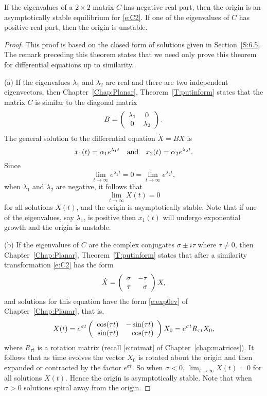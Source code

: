 \documentclass{ximera}
\begin{document}
\begin{theorem}  \label{C:asympstlin}
If the eigenvalues of a $2\times 2$ matrix $C$ has negative real part, then 
the origin is an asymptotically stable equilibrium for \eqref{e:C2}.
If one of the
eigenvalues of $C$ has positive real part, then the origin is unstable.
\end{theorem}

\begin{proof}  This proof is based on the closed form of solutions given in
Section~\ref{S:6.5}.   The remark preceding this theorem states that we
need only prove this theorem for differential equations up to similarity.

\noindent (a) \quad If the eigenvalues $\lambda_1$ and $\lambda_2$ are real
and there are two independent eigenvectors, then Chapter~\ref{Chap:Planar},
Theorem~\ref{T:putinform} states that the matrix $C$ is similar to the
diagonal matrix
\[
B = \left(\begin{array}{cc} \lambda_1 & 0\\ 0 &\lambda_2\end{array}\right).
\]
The general solution to the differential equation $\dot{X}=BX$ is
\[
x_1(t) = \alpha_1e^{\lambda_1 t} \quad\mbox{and}\quad x_2(t) = \alpha_2e^{\lambda_2 t}.
\]
Since
\[
\lim_{t\to\infty}e^{\lambda_1 t} = 0  = \lim_{t\to\infty}e^{\lambda_2 t},
\]
when $\lambda_1$ and $\lambda_2$ are negative, it follows that
\[
\lim_{t\to\infty} X(t) = 0
\]
for all solutions $X(t)$, and the origin is asymptotically stable.  Note that
if one of the eigenvalues, say $\lambda_1$, is positive then $x_1(t)$ will
undergo exponential growth and the origin is unstable.

\noindent (b) \quad If the eigenvalues of $C$ are the complex conjugates
$\sigma\pm i\tau$ where $\tau\neq 0$, then Chapter~\ref{Chap:Planar},
Theorem~\ref{T:putinform} states that after a similarity transformation
\eqref{e:C2} has the form
\[
\dot{X} = \left(\begin{array}{rr} \sigma & -\tau\\ \tau &\sigma\end{array}\right)X,
\]
and solutions for this equation have the form \eqref{e:exp0ev} of
Chapter~\ref{Chap:Planar}, that is,
\[
X(t) = e^{\sigma t}
\left(\begin{array}{rr} \cos(\tau t) & -\sin(\tau t)\\ \sin(\tau t) &\cos(\tau t)\end{array}\right)X_0
= e^{\sigma t}R_{\tau t}X_0,
\]
where $R_{\tau t}$ is a rotation matrix
(recall \eqref{e:rotmat} of
Chapter~\ref{chap:matrices}).  It follows that as time evolves
the vector $X_0$ is rotated about the origin and then expanded or contracted
by the factor $e^{\sigma t}$.  So when $\sigma<0$, $\lim_{t\to\infty} X(t)=0$
for all solutions $X(t)$.  Hence the origin is asymptotically stable.  Note
that when $\sigma>0$ solutions spiral away from the origin.


\end{proof}
\end{document}
